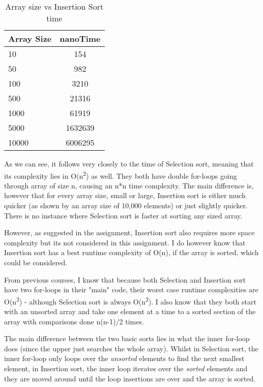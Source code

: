 \documentclass[a4paper,11pt]{article}
\begin{document}
\begin{table}[h]
\begin{center}
\begin{tabular}{l|c}
\textbf{Array Size} & \textbf{nanoTime}\\
\hline
  10      &  154    \\
  50     &  982   \\
  100    &  3210   \\
  500   &  21316  \\
  1000  &  61919 \\
  5000 &  1632639  \\
  10000 &  6006295 \\

\end{tabular}
\caption{Array size vs Insertion Sort time}
\label{tab:table2}
\end{center}
\end{table}

As we can see, it follows very closely to the time of Selection sort, meaning that its complexity lies in O(n\textsuperscript{2}) as well. They both have double for-loops going through array of size n, causing an n*n time complexity. The main difference is, however that for every array size, small or large, Insertion sort is either much quicker (as shown by an array size of 10,000 elements) or just slightly quicker. There is no instance where Selection sort is faster at sorting any sized array. 

However, as suggested in the assignment, Insertion sort also requires more space complexity but its not considered in this assignment. I do however know that Insertion sort has a best runtime complexity of O(n), if the array is sorted, which could be considered.

From previous courses, I know that because both Selection and Insertion sort have two for-loops in their "main" code, their worst case runtime complexities are O(n\textsuperscript{2}) - although Selection sort is always O(n\textsuperscript{2}). I also know that they both start with an unsorted array and take one element at a time to a sorted section of the array with comparisons done n(n-1)/2 times.

The main difference between the two basic sorts lies in what the inner for-loop does (since the upper just searches the whole array). Whilst in Selection sort, the inner for-loop only loops over the {\em unsorted} elements to find the next smallest element, in Insertion sort, the inner loop iterates over the  {\em sorted} elements and they are moved around until the loop insertions are over and the array is sorted.
\end{document}
